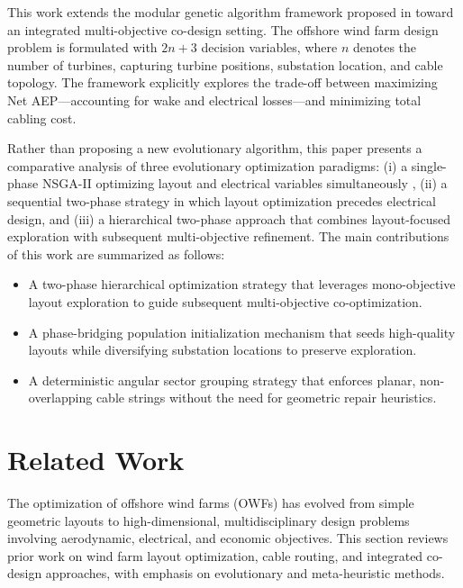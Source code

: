 \documentclass[format=sigconf,anonymous=true,review=true]{acmart}
\begin{document}
This work extends the modular genetic algorithm framework proposed in \cite{Silva2025Layout, Silva2025b} toward an integrated multi-objective co-design setting. The offshore wind farm design problem is formulated with $2n+3$ decision variables, where $n$ denotes the number of turbines, capturing turbine positions, substation location, and cable topology. The framework explicitly explores the trade-off between maximizing Net AEP—accounting for wake and electrical losses—and minimizing total cabling cost.

Rather than proposing a new evolutionary algorithm, this paper presents a comparative analysis of three evolutionary optimization paradigms: (i) a single-phase NSGA-II optimizing layout and electrical variables simultaneously \cite{Deb2002NSGA2}, (ii) a sequential two-phase strategy in which layout optimization precedes electrical design, and (iii) a hierarchical two-phase approach that combines layout-focused exploration with subsequent multi-objective refinement. The main contributions of this work are summarized as follows:

\begin{itemize}
    \item A two-phase hierarchical optimization strategy that leverages mono-objective layout exploration to guide subsequent multi-objective co-optimization.
    \item A phase-bridging population initialization mechanism that seeds high-quality layouts while diversifying substation locations to preserve exploration.
    \item A deterministic angular sector grouping strategy that enforces planar, non-overlapping cable strings without the need for geometric repair heuristics.
\end{itemize}


\section{Related Work}

The optimization of offshore wind farms (OWFs) has evolved from simple geometric layouts to high-dimensional, multidisciplinary design problems involving aerodynamic, electrical, and economic objectives. This section reviews prior work on wind farm layout optimization, cable routing, and integrated co-design approaches, with emphasis on evolutionary and meta-heuristic methods.
\end{document}
